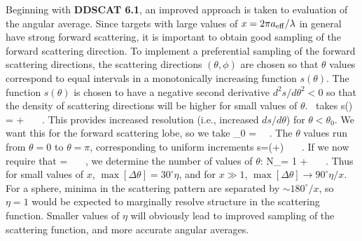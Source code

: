 Beginning with {\bf DDSCAT 6.1}, an improved approach is taken to
evaluation of the angular average.
Since targets with large values of $x=2\pi a_{\rm eff}/\lambda$
in general have strong forward scattering, it is important to obtain
good sampling of the forward scattering direction.  
To implement a preferential
sampling of the forward scattering directions,
the scattering directions $(\theta,\phi)$ 
are chosen so that $\theta$ values correspond to equal intervals in
a monotonically increasing function $s(\theta)$.
The function $s(\theta)$ is chosen to have a 
negative second derivative $d^2s/d\theta^2 < 0$
so that the density of scattering directions will be higher for
small values of $\theta$.
\ddscat\ takes
\beq
s(\theta) = \theta +  ~~~.
\eeq
This provides increased resolution (i.e., increased $ds/d\theta$) for
$\theta < \theta_0$.
We want this for the forward scattering lobe, so we take
\beq
\theta_0 = 
~~.
\eeq
The $\theta$ values run from $\theta=0$ to $\theta=\pi$,
corresponding to uniform increments 
\beq
\Delta s=\left(\pi+\right)
~~~.
\eeq
{}
If we now require that 
\beq
\max[\Delta\theta] \approx {}= 
\eta {}
~~~,
\eeq
we determine the number of values of $\theta$:
\beq
N_\theta = 1 +  
~~~.
\eeq
Thus for small values of $x$, $\max[\Delta\theta]=30^\circ \eta$,
and for $x\gg 1$, $\max[\Delta\theta]\rightarrow 90^\circ\eta/x$.
For a sphere, minima in the scattering pattern are separated by
$\sim180^\circ/x$, so $\eta=1$ would be expected to marginally
resolve structure in the scattering function.
Smaller values of $\eta$ will obviously lead to improved sampling
of the scattering function, and more accurate angular averages.


